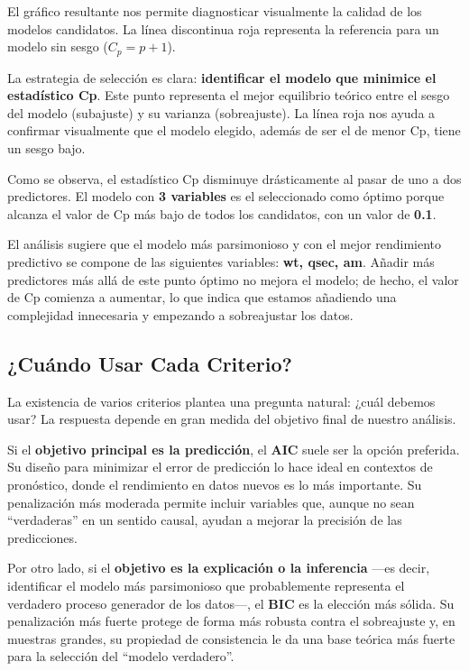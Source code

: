 \documentclass[
  letterpaper,
  DIV=11,
  numbers=noendperiod]{scrreprt}
\begin{document}
\begin{tcolorbox}
El gráfico resultante nos permite diagnosticar visualmente la calidad de
los modelos candidatos. La línea discontinua roja representa la
referencia para un modelo sin sesgo (\(C_p = p+1\)).

La estrategia de selección es clara: \textbf{identificar el modelo que
minimice el estadístico Cp}. Este punto representa el mejor equilibrio
teórico entre el sesgo del modelo (subajuste) y su varianza
(sobreajuste). La línea roja nos ayuda a confirmar visualmente que el
modelo elegido, además de ser el de menor Cp, tiene un sesgo bajo.

Como se observa, el estadístico Cp disminuye drásticamente al pasar de
uno a dos predictores. El modelo con \textbf{3 variables} es el
seleccionado como óptimo porque alcanza el valor de Cp más bajo de todos
los candidatos, con un valor de \textbf{0.1}.

El análisis sugiere que el modelo más parsimonioso y con el mejor
rendimiento predictivo se compone de las siguientes variables:
\textbf{wt, qsec, am}. Añadir más predictores más allá de este punto
óptimo no mejora el modelo; de hecho, el valor de Cp comienza a
aumentar, lo que indica que estamos añadiendo una complejidad
innecesaria y empezando a sobreajustar los datos.

\end{tcolorbox}

\subsection{¿Cuándo Usar Cada
Criterio?}\label{cuuxe1ndo-usar-cada-criterio}

La existencia de varios criterios plantea una pregunta natural: ¿cuál
debemos usar? La respuesta depende en gran medida del objetivo final de
nuestro análisis.

Si el \textbf{objetivo principal es la predicción}, el \textbf{AIC}
suele ser la opción preferida. Su diseño para minimizar el error de
predicción lo hace ideal en contextos de pronóstico, donde el
rendimiento en datos nuevos es lo más importante. Su penalización más
moderada permite incluir variables que, aunque no sean ``verdaderas'' en
un sentido causal, ayudan a mejorar la precisión de las predicciones.

Por otro lado, si el \textbf{objetivo es la explicación o la inferencia}
---es decir, identificar el modelo más parsimonioso que probablemente
representa el verdadero proceso generador de los datos---, el
\textbf{BIC} es la elección más sólida. Su penalización más fuerte
protege de forma más robusta contra el sobreajuste y, en muestras
grandes, su propiedad de consistencia le da una base teórica más fuerte
para la selección del ``modelo verdadero''.
\end{document}
